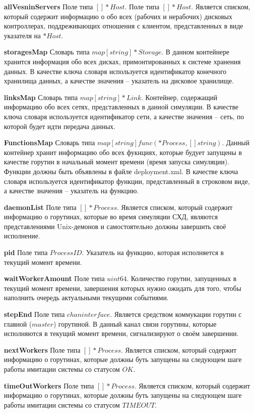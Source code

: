 \textbf{allVesninServers}
Поле типа $[]*Host$. Поле типа $[]*Host$. Является списком, который содержит информацию о обо всех (рабочих и нерабочих) дисковых контроллерах, поддреживающих отношения с клиентом, представленных в виде указателя на $*Host$.

\textbf{storagesMap}   
Словарь типа $map[string]*Storage$. В данном контейнере хранится информация обо всех дисках, примонтированных к системе хранения данных. В качестве ключа словаря используется идентификатор конечного хранилища данных, а качестве значения -- указатель на дисковое хранилище.

\textbf{linksMap}      
Словарь типа $map[string]*Link$. Контейнер, содержащий информацию обо всех сетях, представленных в данной симуляции.  В качестве ключа словаря используется идентификатор сети, а качестве значения -- сеть, по которой будет идти передача данных.

\textbf{FunctionsMap} 
Словарь типа $map[string]func(*Process, []string)$. Данный контейнер хранит информацию обо всех фукнциях, которые будует запущены в качестве горутин в начальный момент времени (время запуска симуляции). Функции должны быть объявлены в файле deployment.xml.  В качестве ключа словаря используется идентификатор функции, представленный в строковом виде, а качестве значения -- указатель на функцию.

\textbf{daemonList}  
Поле типа $[]*Process$. Является списком, который содержит информацию о горутинах, которые во время симуляции СХД, являются представлениями Unix-демонов и самостоятельно должны завершить своё исполнение.

\textbf{pid} 
Поле типа $ProcessID$. Указатель на функцию, которая исполняется в текущий момент времени.

\textbf{waitWorkerAmount} 
Поле типа $uint64$. Количество горутин, запущенных в текущий момент времени, завершения которых нужно ожидать для того, чтобы наполнить очередь актуальными текущими событиями. 

\textbf{stepEnd}        
Поле типа $chan interface{}$. Является средством коммукации горутин с главной ($master$) горутиной. В данный канал связи горутины, которые исполняются в текущий момент времени, сигнализируют о своём завершении.

\textbf{nextWorkers}
Поле типа $[]*Process$. Является списком, который содержит информацию о горутинах, которые должны буть запущены на следующем шаге работы имитации системы со статусом $OK$.

\textbf{timeOutWorkers}   
Поле типа $[]*Process$. Является списком, который содержит информацию о горутинах, которые должны буть запущены на следующем шаге работы имитации системы со статусом $TIMEOUT$.

